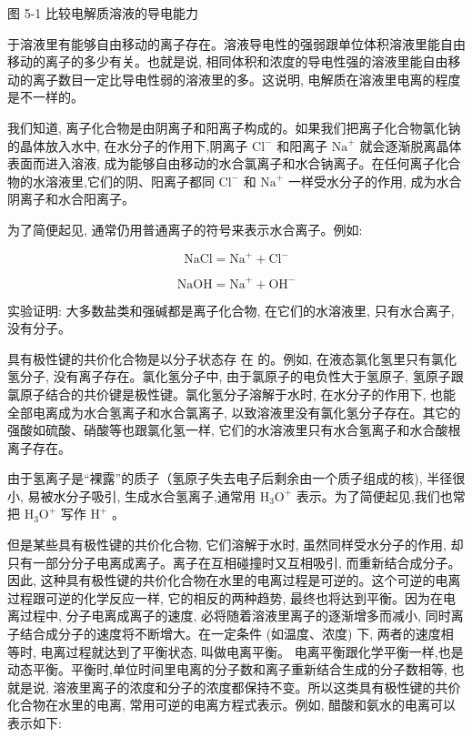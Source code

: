 \documentclass[10pt]{article}
\begin{document}
图 5-1 比较电解质溶液的导电能力

于溶液里有能够自由移动的离子存在。溶液导电性的强弱跟单位体积溶液里能自由移动的离子的多少有关。也就是说, 相同体积和浓度的导电性强的溶液里能自由移动的离子数目一定比导电性弱的溶液里的多。这说明, 电解质在溶液里电离的程度是不一样的。

我们知道, 离子化合物是由阴离子和阳离子构成的。如果我们把离子化合物氯化钠的晶体放入水中, 在水分子的作用下,阴离子 \({\mathrm{{Cl}}}^{ - }\) 和阳离子 \({\mathrm{{Na}}}^{ + }\) 就会逐渐脱离晶体表面而进入溶液, 成为能够自由移动的水合氯离子和水合钠离子。在任何离子化合物的水溶液里,它们的阴、阳离子都同 \({\mathrm{{Cl}}}^{ - }\) 和 \({\mathrm{{Na}}}^{ + }\) 一样受水分子的作用, 成为水合阴离子和水合阳离子。

为了简便起见, 通常仍用普通离子的符号来表示水合离子。例如:

\[
\mathrm{{NaCl}} = {\mathrm{{Na}}}^{ + } + {\mathrm{{Cl}}}^{ - }
\]

\[
\mathrm{{NaOH}} = {\mathrm{{Na}}}^{ + } + {\mathrm{{OH}}}^{ - }
\]

实验证明: 大多数盐类和强碱都是离子化合物, 在它们的水溶液里, 只有水合离子, 没有分子。

具有极性键的共价化合物是以分子状态存 在 的。例如, 在液态氯化氢里只有氯化氢分子, 没有离子存在。氯化氢分子中, 由于氯原子的电负性大于氢原子, 氢原子跟氯原子结合的共价键是极性键。氯化氢分子溶解于水时, 在水分子的作用下, 也能全部电离成为水合氢离子和水合氯离子, 以致溶液里没有氯化氢分子存在。其它的强酸如硫酸、硝酸等也跟氯化氢一样, 它们的水溶液里只有水合氢离子和水合酸根离子存在。

由于氢离子是“裸露”的质子（氢原子失去电子后剩余由一个质子组成的核), 半径很小, 易被水分子吸引, 生成水合氢离子,通常用 \({\mathrm{H}}_{3}{\mathrm{O}}^{ + }\) 表示。为了简便起见,我们也常把 \({\mathrm{H}}_{3}{\mathrm{O}}^{ + }\) 写作 \({\mathrm{H}}^{ + }\) 。

但是某些具有极性键的共价化合物, 它们溶解于水时, 虽然同样受水分子的作用, 却只有一部分分子电离成离子。离子在互相碰撞时又互相吸引, 而重新结合成分子。因此, 这种具有极性键的共价化合物在水里的电离过程是可逆的。这个可逆的电离过程跟可逆的化学反应一样, 它的相反的两种趋势, 最终也将达到平衡。因为在电离过程中, 分子电离成离子的速度, 必将随着溶液里离子的逐渐增多而减小, 同时离子结合成分子的速度将不断增大。在一定条件 (如温度、浓度) 下, 两者的速度相等时, 电离过程就达到了平衡状态, 叫做电离平衡。 电离平衡跟化学平衡一样,也是动态平衡。平衡时,单位时间里电离的分子数和离子重新结合生成的分子数相等, 也就是说, 溶液里离子的浓度和分子的浓度都保持不变。所以这类具有极性键的共价化合物在水里的电离, 常用可逆的电离方程式表示。例如, 醋酸和氨水的电离可以表示如下:
\end{document}
